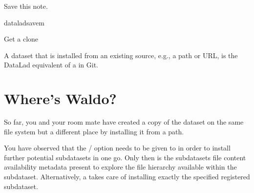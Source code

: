 \sphinxAtStartPar
Save this note.

\begin{sphinxVerbatim}[commandchars=\\\{\}]
dataladsave\PYGZhy{}m
\end{sphinxVerbatim}

\ignorespaces \begin{gitusernote}[label={index-4}, before title={\thetcbcounter\ }, check odd page=true]{Get a clone}
\label{\detokenize{basics/101-116-sharelocal:index-4}}

\sphinxAtStartPar
A dataset that is installed from an existing source, e.g., a path or URL,
is the DataLad equivalent of a  in Git.


\end{gitusernote}

\sphinxstepscope

\ignorespaces 

\section{Where’s Waldo?}
\label{\detokenize{basics/101-117-sharelocal2:where-s-waldo}}\label{\detokenize{basics/101-117-sharelocal2:sharelocal2}}\label{\detokenize{basics/101-117-sharelocal2:index-0}}\label{\detokenize{basics/101-117-sharelocal2::doc}}
\sphinxAtStartPar
So far, you and your room mate have created a copy of the 
dataset on the same file system but a different place by installing
it from a path.

\sphinxAtStartPar
You have observed that the /
option needs to be given to 
in order to install further potential subdatasets in one go. Only then
is the subdatasets file content availability metadata present to explore
the file hierarchy available within the subdataset.
Alternatively, a  takes care of installing
exactly the specified registered subdataset.

